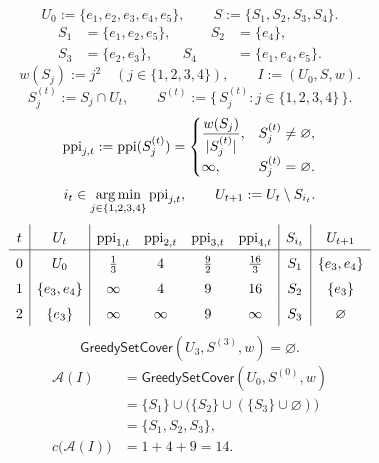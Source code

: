 \documentclass[12pt,a4paper]{article}
\begin{document}
\noindent\begin{minipage}{\linewidth}
\begin{example}
\[
U_0:=\{e_1,e_2,e_3,e_4,e_5\},\qquad
S:=\{S_1,S_2,S_3,S_4\}.
\]
\[
\begin{aligned}
S_1&=\{e_1,e_2,e_5\},&\qquad S_2&=\{e_4\},\\
S_3&=\{e_2,e_3\},& S_4&=\{e_1,e_4,e_5\}.
\end{aligned}
\]
\[
w(S_j):=j^2\quad(j\in\{1,2,3,4\}),\qquad
I:=(U_0,S,w).
\]
\[
S_j^{(t)}:=S_j\cap U_t,\qquad
S^{(t)}:=\{\,S_j^{(t)}:j\in\{1,2,3,4\}\,\}.
\]
\[
\operatorname{ppi}_{j,t}:=\operatorname{ppi}(S_j^{(t)})=\begin{cases}
\dfrac{w(S_j)}{|S_j^{(t)}|},&S_j^{(t)}\neq\varnothing,\\[3pt]
\infty,&S_j^{(t)}=\varnothing.
\end{cases}
\]
\[
i_t\in\operatorname*{arg\,min}_{j\in\{1,2,3,4\}}\operatorname{ppi}_{j,t},\qquad
U_{t+1}:=U_t\setminus S_{i_t}.
\]
\[
\renewcommand{\arraystretch}{1.5}
\begin{array}{c|c|cccc|c|c}
t&U_t&\ppi_{1,t}&\ppi_{2,t}&\ppi_{3,t}&\ppi_{4,t}&S_{i_t}&U_{t+1}\\ \hline
0&U_0&\frac13&4&\frac92&\frac{16}{3}&S_1&\{e_3,e_4\}\\
1&\{e_3,e_4\}&\infty&4&9&16&S_2&\{e_3\}\\
2&\{e_3\}&\infty&\infty&9&\infty&S_3&\varnothing
\end{array}
\]
\[
\mathsf{GreedySetCover}(U_3,S^{(3)},w)=\varnothing.
\]
\[
\begin{aligned}
\mathcal A(I)
&=\mathsf{GreedySetCover}(U_0,S^{(0)},w)\\
&=\{S_1\}\cup\bigl(\{S_2\}\cup(\{S_3\}\cup\varnothing)\bigr)\\
&=\{S_1,S_2,S_3\},\\[3pt]
c\bigl(\mathcal A(I)\bigr)&=1+4+9=14.
\end{aligned}
\]
\end{example}
\end{minipage}\par
\end{document}
